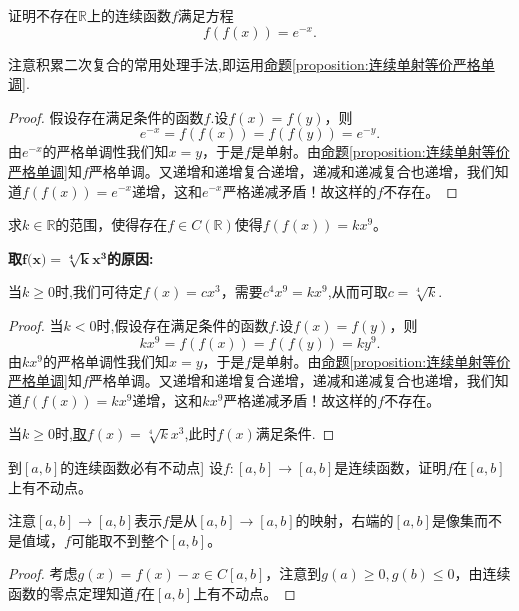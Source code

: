 \documentclass[lang=cn,newtx,10pt,scheme=chinese]{elegantbook}
\begin{document}
\begin{example}
证明不存在\(\mathbb{R}\)上的连续函数\(f\)满足方程
\[
f(f(x)) = e^{-x}.
\]
\end{example}
\begin{note}
注意积累二次复合的常用处理手法,即运用\hyperref[proposition:连续单射等价严格单调]{命题\ref{proposition:连续单射等价严格单调}}.
\end{note}
\begin{proof}
假设存在满足条件的函数$f$.设\(f(x)=f(y)\)，则
\[
e^{-x}=f(f(x)) = f(f(y)) = e^{-y}.
\]
由\(e^{-x}\)的严格单调性我们知\(x = y\)，于是\(f\)是单射。由\hyperref[proposition:连续单射等价严格单调]{命题\ref{proposition:连续单射等价严格单调}}知\(f\)严格单调。又递增和递增复合递增，递减和递减复合也递增，我们知道\(f(f(x)) = e^{-x}\)递增，这和\(e^{-x}\)严格递减矛盾！故这样的\(f\)不存在。
\end{proof}

\begin{example}
求\(k\in\mathbb{R}\)的范围，使得存在\(f\in C(\mathbb{R})\)使得\(f(f(x)) = kx^{9}\)。
\end{example}
\begin{note}
\hypertarget{取这个函数的原因}{\textbf{取$\boldsymbol{f}\mathbf{(}\boldsymbol{x}\mathbf{)}=\sqrt[\mathbf{4}]{\boldsymbol{k}}\boldsymbol{x}^{\mathbf{3}}$的原因:}}当\(k\geqslant0\)时,我们可待定\(f(x)=cx^{3}\)，需要\(c^{4}x^{9}=kx^{9}\),从而可取\(c = \sqrt[4]{k}\).
\end{note}
\begin{proof}
当$k<0$时,假设存在满足条件的函数$f$.设\(f(x)=f(y)\)，则
\[
kx^{9}=f(f(x)) = f(f(y)) = ky^{9}.
\]
由\(kx^{9}\)的严格单调性我们知\(x = y\)，于是\(f\)是单射。由\hyperref[proposition:连续单射等价严格单调]{命题\ref{proposition:连续单射等价严格单调}}知\(f\)严格单调。又递增和递增复合递增，递减和递减复合也递增，我们知道\(f(f(x)) = kx^{9}\)递增，这和\(kx^{9}\)严格递减矛盾！故这样的\(f\)不存在。

当\(k\geqslant0\)时,\hyperlink{取这个函数的原因}{取$f(x)=\sqrt[4]{k}x^3$},此时$f(x)$满足条件.
\end{proof}

\begin{proposition}[\([a,b]\)到\([a,b]\)的连续函数必有不动点]\label{proposition:[a,b]到[a,b]的连续函数必有不动点}
设\(f:[a,b]\to[a,b]\)是连续函数，证明\(f\)在\([a,b]\)上有不动点。
\end{proposition}
\begin{note}
注意\([a,b]\to[a,b]\)表示\(f\)是从\([a,b]\to[a,b]\)的映射，右端的\([a,b]\)是像集而不是值域，\(f\)可能取不到整个\([a,b]\)。
\end{note}
\begin{proof}
考虑\(g(x)=f(x)-x\in C[a,b]\)，注意到\(g(a)\geqslant0,g(b)\leqslant0\)，由连续函数的零点定理知道\(f\)在\([a,b]\)上有不动点。
\end{proof}
\end{document}
